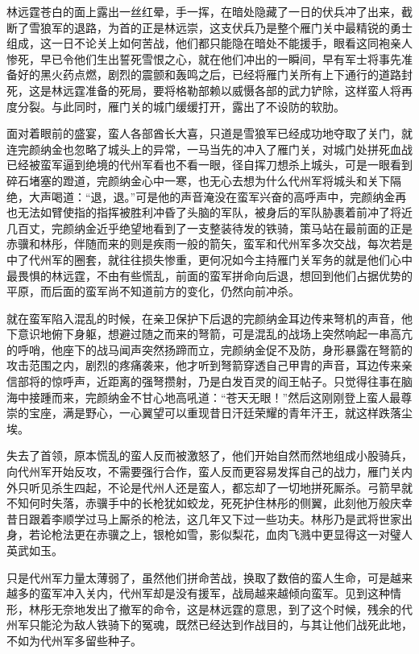 林远霆苍白的面上露出一丝红晕，手一挥，在暗处隐藏了一日的伏兵冲了出来，截断了雪狼军的退路，为首的正是林远崇，这支伏兵乃是整个雁门关中最精锐的勇士组成，这一日不论关上如何苦战，他们都只能隐在暗处不能援手，眼看这同袍亲人惨死，早已令他们生出誓死雪恨之心，就在他们冲出的一瞬间，早有军士将事先准备好的黑火药点燃，剧烈的震颤和轰鸣之后，已经将雁门关所有上下通行的道路封死，这是林远霆准备的死局，要将格勒部赖以威慑各部的武力铲除，这样蛮人将再度分裂。与此同时，雁门关的城门缓缓打开，露出了不设防的软肋。

面对着眼前的盛宴，蛮人各部酋长大喜，只道是雪狼军已经成功地夺取了关门，就连完颜纳金也忽略了城头上的异常，一马当先的冲入了雁门关，对城门处拼死血战已经被蛮军逼到绝境的代州军看也不看一眼，径自挥刀想杀上城头，可是一眼看到碎石堵塞的蹬道，完颜纳金心中一寒，也无心去想为什么代州军将城头和关下隔绝，大声喝道：“退，退。”可是他的声音淹没在蛮军兴奋的高呼声中，完颜纳金再也无法如臂使指的指挥被胜利冲昏了头脑的军队，被身后的军队胁裹着前冲了将近几百丈，完颜纳金近乎绝望地看到了一支整装待发的铁骑，策马站在最前面的正是赤骥和林彤，伴随而来的则是疾雨一般的箭矢，蛮军和代州军多次交战，每次若是中了代州军的圈套，就往往损失惨重，更何况如今主持雁门关军务的就是他们心中最畏惧的林远霆，不由有些慌乱，前面的蛮军拼命向后退，想回到他们占据优势的平原，而后面的蛮军尚不知道前方的变化，仍然向前冲杀。

就在蛮军陷入混乱的时候，在亲卫保护下后退的完颜纳金耳边传来弩机的声音，他下意识地俯下身躯，想避过随之而来的弩箭，可是混乱的战场上突然响起一串高亢的呼哨，他座下的战马闻声突然扬蹄而立，完颜纳金促不及防，身形暴露在弩箭的攻击范围之内，剧烈的疼痛袭来，他才听到弩箭穿透自己甲胄的声音，耳边传来亲信部将的惊呼声，近距离的强弩攒射，乃是白发百灵的阎王帖子。只觉得往事在脑海中接踵而来，完颜纳金不甘心地高吼道：“苍天无眼！”然后这刚刚登上蛮人最尊崇的宝座，满是野心，一心翼望可以重现昔日汗廷荣耀的青年汗王，就这样跌落尘埃。

失去了首领，原本慌乱的蛮人反而被激怒了，他们开始自然而然地组成小股骑兵，向代州军开始反攻，不需要强行合作，蛮人反而更容易发挥自己的战力，雁门关内外只听见杀生四起，不论是代州人还是蛮人，都忘却了一切地拼死厮杀。弓箭早就不知何时失落，赤骥手中的长枪犹如蛟龙，死死护住林彤的侧翼，此刻他万般庆幸昔日跟着李顺学过马上厮杀的枪法，这几年又下过一些功夫。林彤乃是武将世家出身，若论枪法更在赤骥之上，银枪如雪，影似梨花，血肉飞溅中更显得这一对璧人英武如玉。

只是代州军力量太薄弱了，虽然他们拼命苦战，换取了数倍的蛮人生命，可是越来越多的蛮军冲入关内，代州军却是没有援军，战局越来越倾向蛮军。见到这种情形，林彤无奈地发出了撤军的命令，这是林远霆的意思，到了这个时候，残余的代州军只能沦为敌人铁骑下的冤魂，既然已经达到作战目的，与其让他们战死此地，不如为代州军多留些种子。

